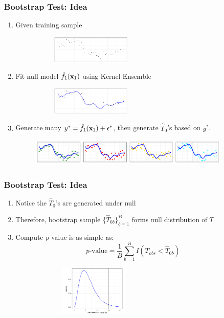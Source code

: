 \documentclass{beamer}
\begin{document}
\begin{frame}
\frametitle{Bootstrap Test: Idea}
\begin{enumerate}
    \item<+-> Given training sample 
    \begin{figure}
	\centering
    \includegraphics[height=1.4cm, width=6cm]{./plot/para1}     
    \end{figure}
    \item<+-> Fit null model $\hat{f}_1({\bf x}_1)$ using Kernel Ensemble
    \begin{figure}
	\centering
    \includegraphics[height=1.4cm, width=6cm]{./plot/para2}     
    \end{figure}
    \item<+-> Generate many $y^*= \hat{f}_1({\bf x}_1) + \epsilon^*$, then generate $\hat{T}_0$'s based on $y^*$.
    \begin{figure}
	\centering
    \includegraphics[height=1.4cm, width=10cm]{./plot/para_boot}         
    \end{figure}    
  \end{enumerate}
\end{frame}

\begin{frame}  
\frametitle{Bootstrap Test: Idea}
\begin{enumerate}
\item Notice the $\hat{T}_0$'s are generated under null
\item Therefore, bootstrap sample $\{\hat{T}_{0b}\}_{b=1}^B$ forms null distribution of $T$
\item Compute p-value is as simple as:
$$p\mbox{-value} = \frac{1}{B}\sum_{b=1}^B I(T_{obs} < \hat{T}_{0b})$$
\end{enumerate}
\begin{figure}
\includegraphics[width=0.68\textwidth, height=2.5cm]{./plot/p_value} 
\end{figure}
\end{frame}
\end{document}

